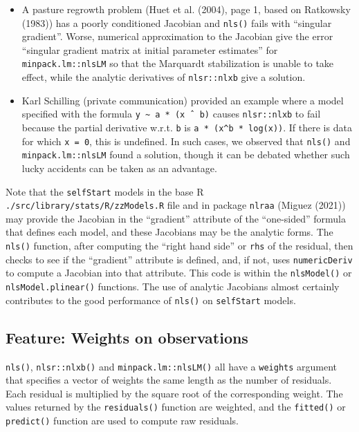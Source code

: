\begin{itemize}
\item
  A pasture regrowth problem (Huet et al. (2004), page 1, based on Ratkowsky (1983)) has a poorly
  conditioned Jacobian and \texttt{nls()} fails with ``singular gradient''.
  Worse, numerical approximation to the Jacobian give the error
  ``singular gradient matrix at initial parameter estimates'' for \texttt{minpack.lm::nlsLM}
  so that the Marquardt stabilization is unable to take effect, while the analytic
  derivatives of \texttt{nlsr::nlxb} give a solution.
\item
  Karl Schilling (private communication) provided an example where a model specified
  with the formula \texttt{y\ \textasciitilde{}\ a\ *\ (x\ ˆ\ b)} causes \texttt{nlsr::nlxb} to fail because the partial
  derivative w.r.t. \texttt{b} is \texttt{a\ *\ (x\^{}b\ *\ log(x))}. If there is data for which \texttt{x\ =\ 0},
  this is undefined. In such cases, we observed that \texttt{nls()} and \texttt{minpack.lm::nlsLM}
  found a solution, though it can be debated whether such lucky accidents can be
  taken as an advantage.
\end{itemize}

Note that the \texttt{selfStart} models in the base R \texttt{./src/library/stats/R/zzModels.R}
file and in package \texttt{nlraa} (Miguez (2021)) may
provide the Jacobian in the ``gradient'' attribute of the ``one-sided'' formula that
defines each model, and these Jacobians may be the analytic forms. The \texttt{nls()}
function, after computing the ``right hand side'' or \texttt{rhs} of the residual, then
checks to see if the ``gradient'' attribute is defined, and, if not, uses
\texttt{numericDeriv} to compute a Jacobian
into that attribute. This code is within the \texttt{nlsModel()} or \texttt{nlsModel.plinear()}
functions. The use of analytic Jacobians almost certainly contributes to the good
performance of \texttt{nls()} on \texttt{selfStart} models.

\hypertarget{feature-weights-on-observations}{%
\subsection{Feature: Weights on observations}\label{feature-weights-on-observations}}

\texttt{nls()}, \texttt{nlsr::nlxb()} and \texttt{minpack.lm::nlsLM()} all have a \texttt{weights} argument that
specifies a vector of weights the same length as the number of residuals. Each
residual is multiplied by the square root of the corresponding weight. The values
returned by the \texttt{residuals()} function are weighted, and the \texttt{fitted()} or
\texttt{predict()} function are used to compute raw residuals.

